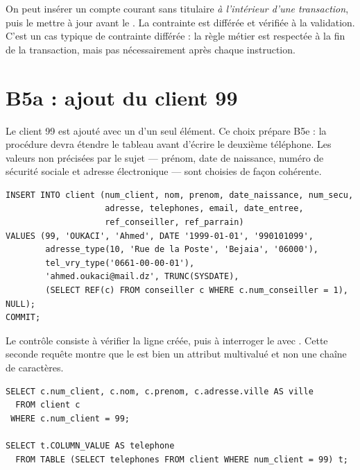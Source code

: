 \begin{clebox}
On peut insérer un compte courant sans titulaire \emph{à l'intérieur d'une
transaction}, puis le mettre à jour avant le . La contrainte
 est différée et vérifiée à la validation. C'est un cas
typique de contrainte différée : la règle métier est respectée à la fin de la
transaction, mais pas nécessairement après chaque instruction.
\end{clebox}

\section{B5a : ajout du client 99}

Le client 99 est ajouté avec un  d'un seul élément. Ce choix
prépare B5e : la procédure  devra étendre le tableau
avant d'écrire le deuxième téléphone. Les valeurs non précisées par le sujet
— prénom, date de naissance, numéro de sécurité sociale et adresse électronique
— sont choisies de façon cohérente.

\begin{lstlisting}[caption={B5a : insertion du client 99 avec un téléphone.},label={lst:b5a}]
INSERT INTO client (num_client, nom, prenom, date_naissance, num_secu,
                    adresse, telephones, email, date_entree,
                    ref_conseiller, ref_parrain)
VALUES (99, 'OUKACI', 'Ahmed', DATE '1999-01-01', '990101099',
        adresse_type(10, 'Rue de la Poste', 'Bejaia', '06000'),
        tel_vry_type('0661-00-00-01'),
        'ahmed.oukaci@mail.dz', TRUNC(SYSDATE),
        (SELECT REF(c) FROM conseiller c WHERE c.num_conseiller = 1), NULL);
COMMIT;
\end{lstlisting}

Le contrôle consiste à vérifier la ligne créée, puis à interroger le
 avec . Cette seconde requête montre que le
 est bien un attribut multivalué et non une chaîne de caractères.

\begin{lstlisting}[caption={Contrôle du client 99 et de son téléphone.},label={lst:b5a-controle}]
SELECT c.num_client, c.nom, c.prenom, c.adresse.ville AS ville
  FROM client c
 WHERE c.num_client = 99;

SELECT t.COLUMN_VALUE AS telephone
  FROM TABLE (SELECT telephones FROM client WHERE num_client = 99) t;
\end{lstlisting}

